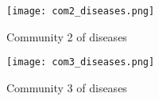 \begin{figure}[H]
    \centering
    \texttt{[image: com2\_diseases.png]}
    \caption{Community 2 of diseases}
    \label{fig:com2_diseases}
\end{figure}

\begin{figure}[H]
    \centering
    \texttt{[image: com3\_diseases.png]}
    \caption{Community 3 of diseases}
    \label{fig:com3_diseases}
\end{figure}